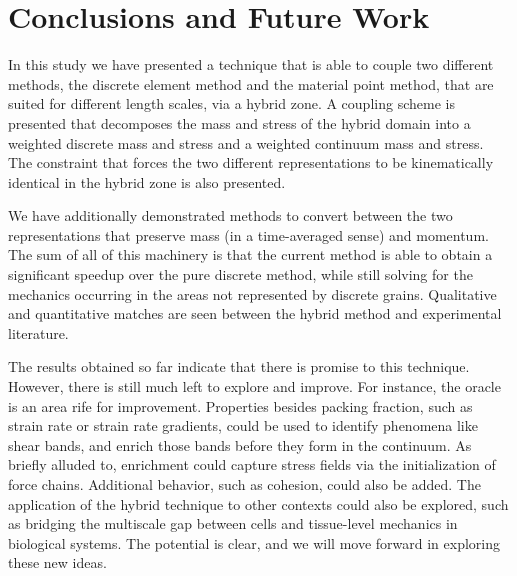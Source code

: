 \chapter{Conclusions and Future Work}
In this study we have presented a technique that is able to couple two different methods, the discrete element method and the material point method, that are suited for different length scales, via a hybrid zone. A coupling scheme is presented that decomposes the mass and stress of the hybrid domain into a weighted discrete mass and stress and a weighted continuum mass and stress. The constraint that forces the two different representations to be kinematically identical in the hybrid zone is also presented.

We have additionally demonstrated methods to convert between the two representations that preserve mass (in a time-averaged sense) and momentum. The sum of all of this machinery is that the current method is able to obtain a significant speedup over the pure discrete method, while still solving for the mechanics occurring in the areas not represented by discrete grains. Qualitative and quantitative matches are seen between the hybrid method and experimental literature.

The results obtained so far indicate that there is promise to this technique. However, there is still much left to explore and improve. For instance, the oracle is an area rife for improvement. Properties besides packing fraction, such as strain rate or strain rate gradients, could be used to identify phenomena like shear bands, and enrich those bands before they form in the continuum. As briefly alluded to, enrichment could capture stress fields via the initialization of force chains. Additional behavior, such as cohesion, could also be added. The application of the hybrid technique to other contexts could also be explored, such as bridging the multiscale gap between cells and tissue-level mechanics in biological systems. The potential is clear, and we will move forward in exploring these new ideas.